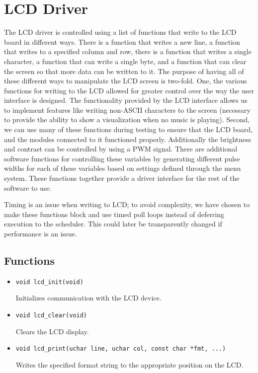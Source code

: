 \section{LCD Driver}
\label{sec:lcd-driver}
The LCD driver is controlled using a list of functions that write to the LCD board in different ways. There is a function that writes a new line, a function that writes to a specified column and row, there is a function that writes a single character, a function that can write a single byte, and a function that can clear the screen so that more data can be written to it. The purpose of having all of these different ways to manipulate the LCD screen is two-fold. One, the various functions for writing to the LCD allowed for greater control over the way the user interface is designed. The functionality provided by the LCD interface allows us to implement features like writing non-ASCII characters to the screen (necessary to provide the ability to show a visualization when no music is playing). Second, we can use many of these functions during testing to ensure that the LCD board, and the modules connected to it functioned properly. Additionally the brightness and contrast can be controlled by using a PWM signal. There are additional software functions for controlling these variables by generating different pulse widths for each of these variables based on settings defined through the menu system. These functions together provide a driver interface for the rest of the software to use.

Timing is an issue when writing to LCD; to avoid complexity, we have chosen to make these functions block and use timed poll loops instead of deferring execution to the scheduler. This could later be transparently changed if performance is an issue.

\subsection*{Functions}
\begin{itemize}
\item \verb|void lcd_init(void)|

Initializes communication with the LCD device.

\item \verb|void lcd_clear(void)|

Clears the LCD display.

\item \verb|void lcd_print(uchar line, uchar col, const char *fmt, ...)|

Writes the specified format string to the appropriate position on the LCD.
\end{itemize}

